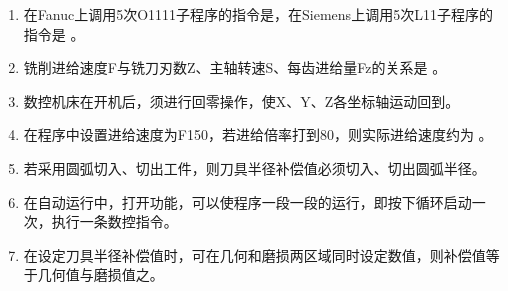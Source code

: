 \documentclass[12pt,twocolumn,landscape,UTF8,twoside]{ctexart}
\begin{document}
\begin{spacing}{1.3}
\begin{enumerate} [1、]
		\item 在Fanuc上调用5次O1111子程序的指令是，在Siemens上调用5次L11子程序的指令是	。

		
		\item 铣削进给速度F与铣刀刃数Z、主轴转速S、每齿进给量Fz的关系是			。
		
		
		\item 数控机床在开机后，须进行回零操作，使X、Y、Z各坐标轴运动回到。
		
		
		\item 在程序中设置进给速度为F150，若进给倍率打到80，则实际进给速度约为	。
		

		\item 若采用圆弧切入、切出工件，则刀具半径补偿值必须切入、切出圆弧半径。


		\item 在自动运行中，打开功能，可以使程序一段一段的运行，即按下循环启动一次，执行一条数控指令。



		\item 在设定刀具半径补偿值时，可在几何和磨损两区域同时设定数值，则补偿值等于几何值与磨损值之。

		

\end{enumerate}
\end{spacing}
\end{document}
